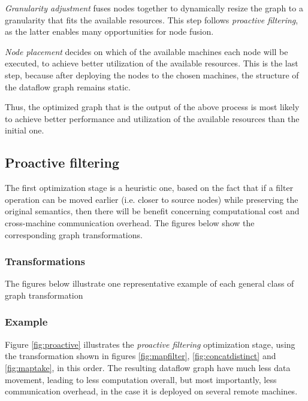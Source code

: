 \documentclass[sigplan,review,anonymous]{acmart}
\begin{document}
\textit{Granularity adjustment} fuses nodes together to dynamically resize the
graph to a granularity that fits the available resources. This step follows
\textit{proactive filtering}, as the latter enables many opportunities for node
fusion.

\textit{Node placement} decides on which of the available machines each node
will be executed, to achieve better utilization of the available resources.
This is the last step, because after deploying the nodes to the chosen
machines, the structure of the dataflow graph remains static.

Thus, the optimized graph that is the output of the above process is most likely
to achieve better performance and utilization of the available resources than
the initial one.

\subsection{Proactive filtering}

The first optimization stage is a heuristic one, based on the fact that if a
filter operation can be moved earlier (i.e. closer to source nodes) while
preserving the original semantics, then there will be benefit concerning
computational cost and cross-machine communication overhead. The figures below
show the corresponding graph transformations.

\subsubsection{Transformations}

The figures below illustrate one representative example of each general class of
graph transformation


\subsubsection{Example}

Figure \ref{fig:proactive} illustrates the \textit{proactive filtering}
optimization stage, using the transformation shown in figures
\ref{fig:mapfilter}, \ref{fig:concatdistinct} and \ref{fig:maptake}, in this
order. The resulting dataflow graph have much less data movement, leading to
less computation overall, but most importantly, less communication overhead, in
the case it is deployed on several remote machines.
\end{document}

